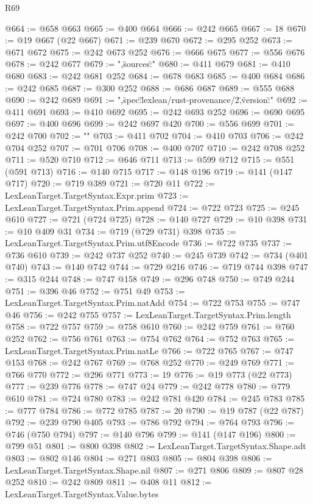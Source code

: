 \begin{lexlean}{R69}
\begin{coremodule}
{@664 := @658 @663
@665 := @400 @664
@666 := @242 @665
@667 := 18
@670 := @19 @667 (@22 @667)
@671 := @239 @670
@672 := @295 @252
@673 := @671 @672
@675 := @242 @673 @252
@676 := @666 @675
@677 := @556 @676
@678 := @242 @677
@679 := ",\"sources\":"
@680 := @411 @679
@681 := @410 @680
@683 := @242 @681 @252
@684 := @678 @683
@685 := @400 @684
@686 := @242 @685
@687 := @300 @252
@688 := @686 @687
@689 := @555 @688
@690 := @242 @689
@691 := ",\"spec\":\"lexlean/rust-provenance/2\",\"version\":"
@692 := @411 @691
@693 := @410 @692
@695 := @242 @693 @252
@696 := @690 @695
@697 := @400 @696
@699 := @242 @697 @420
@700 := @556 @699
@701 := @242 @700
@702 := "}\n"
@703 := @411 @702
@704 := @410 @703
@706 := @242 @704 @252
@707 := @701 @706
@708 := @400 @707
@710 := @242 @708 @252
@711 := @520 @710
@712 := @646 @711
@713 := @599 @712
@715 := @551 (@591 @713)
@716 := @140 @715
@717 := @148 @196
@719 := @141 (@147 @717)
@720 := @719 @389
@721 := @720 @11
@722 := LexLeanTarget.TargetSyntax.Expr.prim
@723 := LexLeanTarget.TargetSyntax.Prim.append
@724 := @722 @723
@725 := @245 @610
@727 := @721 (@724 @725)
@728 := @140 @727
@729 := @10 @398
@731 := @10 @409 @31
@734 := @719 (@729 @731) @398
@735 := LexLeanTarget.TargetSyntax.Prim.utf8Encode
@736 := @722 @735
@737 := @736 @610
@739 := @242 @737 @252
@740 := @245 @739
@742 := @734 (@401 @740)
@743 := @140 @742
@744 := @729 @216
@746 := @719 @744 @398
@747 := @315 @244
@748 := @747 @158
@749 := @296 @748
@750 := @749 @244
@751 := @396 @46
@752 := @751 @49
@753 := LexLeanTarget.TargetSyntax.Prim.natAdd
@754 := @722 @753
@755 := @747 @46
@756 := @242 @755
@757 := LexLeanTarget.TargetSyntax.Prim.length
@758 := @722 @757
@759 := @758 @610
@760 := @242 @759
@761 := @760 @252
@762 := @756 @761
@763 := @754 @762
@764 := @752 @763
@765 := LexLeanTarget.TargetSyntax.Prim.natLe
@766 := @722 @765
@767 := @747 @153
@768 := @242 @767
@769 := @768 @252
@770 := @249 @769
@771 := @766 @770
@772 := @296 @771
@773 := 19
@776 := @19 @773 (@22 @773)
@777 := @239 @776
@778 := @747 @24
@779 := @242 @778
@780 := @779 @610
@781 := @724 @780
@783 := @242 @781 @420
@784 := @245 @783
@785 := @777 @784
@786 := @772 @785
@787 := 20
@790 := @19 @787 (@22 @787)
@792 := @239 @790 @405
@793 := @786 @792
@794 := @764 @793
@796 := @746 (@750 @794)
@797 := @140 @796
@799 := @141 (@147 @196)
@800 := @799 @51
@801 := @800 @398
@802 := LexLeanTarget.TargetSyntax.Shape.adt
@803 := @802 @146
@804 := @271 @803
@805 := @804 @398
@806 := LexLeanTarget.TargetSyntax.Shape.nil
@807 := @271 @806
@809 := @807 @28 @252
@810 := @242 @809
@811 := @408 @11
@812 := LexLeanTarget.TargetSyntax.Value.bytes

\end{coremodule}
\end{lexlean}
